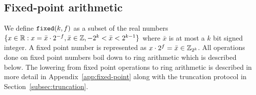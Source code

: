 \subsection{Fixed-point arithmetic}
\label{subsec:fixed-point}


We define $\verb|fixed|(k, f)$ as a subset of the real numbers $\{x \in \mathbb{R} : x = \bar{x} \cdot 2^{-f}, \bar{x} \in \mathbb{Z}, -2^k < \bar{x} < 2^{k-1}\}$ where $\bar{x}$ is at most a $k$ bit signed integer. A fixed point number is represented as $x \cdot 2^{f} = \bar{x} \in \mathbb{Z}_{2^k}$. All operations done on fixed point numbers boil down to ring arithmetic which is described below. The lowering from fixed point operations to ring arithmetic is described in more detail in Appendix~\ref{app:fixed-point} along with the truncation protocol in Section~\ref{subsec:truncation}.
